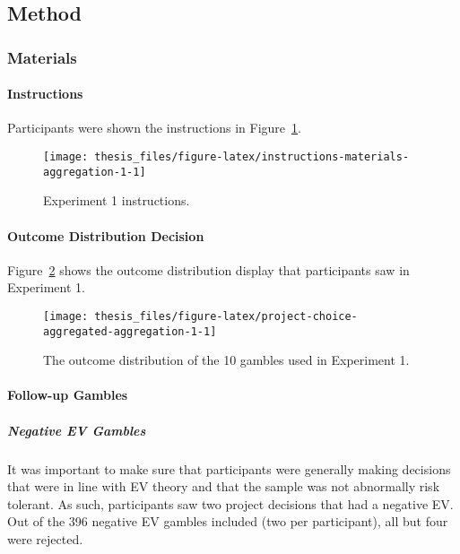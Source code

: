 \documentclass[a4paper, nobind]{templates/ociamthesis}
\theoremstyle{definition}
\theoremstyle{definition}
\theoremstyle{definition}
\theoremstyle{definition}
\theoremstyle{remark}
\begin{document}
\subsection{Method}

\subsubsection{Materials}

\paragraph{Instructions}

Participants were shown the instructions in
Figure~\ref{fig:instructions-materials-aggregation-1}.



\begin{figure}
\texttt{[image: thesis\_files/figure-latex/instructions-materials-aggregation-1-1]} \caption{Experiment 1 instructions.}\label{fig:instructions-materials-aggregation-1}
\end{figure}

\paragraph{Outcome Distribution Decision}

Figure~\ref{fig:project-choice-aggregated-aggregation-1} shows the outcome
distribution display that participants saw in Experiment 1.



\begin{figure}
\texttt{[image: thesis\_files/figure-latex/project-choice-aggregated-aggregation-1-1]} \caption{The outcome distribution of the 10 gambles used in Experiment 1.}\label{fig:project-choice-aggregated-aggregation-1}
\end{figure}

\hypertarget{follow-up-materials-aggregation-1-appendix}{%
\paragraph{Follow-up Gambles}\label{follow-up-materials-aggregation-1-appendix}}

\subparagraph{Negative EV Gambles}

It was important to make sure that participants were generally making decisions
that were in line with EV theory and that the sample was not abnormally risk
tolerant. As such, participants saw two project decisions that had a negative
EV. Out of the 396 negative EV gambles
included (two per participant), all but four
were rejected.
\end{document}
